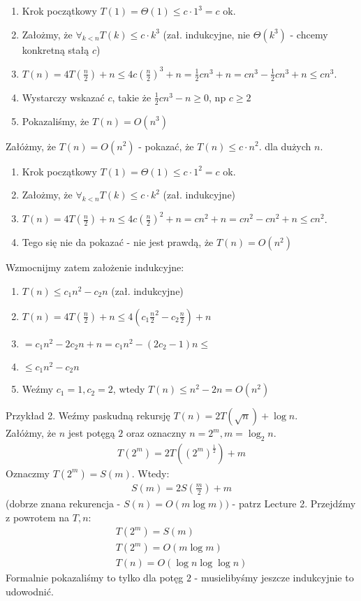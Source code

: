 \documentclass{article}
\numberwithin{equation}{subsection}
\begin{document}
\begin{enumerate}
    \item Krok początkowy $T(1) = \Theta(1) \leq c\cdot 1^3 = c$ ok.
    \item Założmy, że $\forall_{k<n}  T(k) \leq c\cdot k^3$ (zał. indukcyjne, nie $\Theta(k^3)$ - chcemy konkretną stałą $c$)
    \item $T(n) = 4T\left(\frac{n}{2}\right) + n \leq 4c\left(\frac{n}{2}\right)^3 + n = \frac{1}{2}cn^3 + n = cn^3 - \frac{1}{2}cn^3 + n \leq cn^3$.
    \item Wystarczy wskazać $c$, takie że $\frac{1}{2}cn^3 - n \geq 0$, np $c\geq 2$
    \item Pokazaliśmy, że $T(n) = O(n^3)$
\end{enumerate}
Załóżmy, że $T(n)=O(n^2)$ - pokazać, że $T(n)\leq c\cdot n^2$. dla dużych $n$.
\begin{enumerate}
    \item Krok początkowy $T(1) = \Theta(1) \leq c\cdot 1^2 = c$ ok.
    \item Założmy, że $\forall_{k<n}  T(k) \leq c\cdot k^2$ (zał. indukcyjne)
    \item $T(n) = 4T\left(\frac{n}{2}\right) + n \leq 4c\left(\frac{n}{2}\right)^2 + n = cn^2 + n = cn^2 - cn^2 + n \leq cn^2$.
    \item Tego się nie da pokazać - nie jest prawdą, że $T(n) = O(n^2)$
\end{enumerate}
Wzmocnijmy zatem założenie indukcyjne:
\begin{enumerate}
    \item $T(n) \leq c_1 n^2 - c_2 n$ (zał. indukcyjne)
    \item $T(n) = 4T\left(\frac{n}{2}\right) + n \leq 4(c_1 \frac{n}{2}^2 - c_2 \frac{n}{2}) + n$
    \item $= c_1 n^2 - 2c_2 n + n = c_1n^2 - (2c_2 -1)n \leq$
    \item $\leq c_1n^2 - c_2n$
    \item Weźmy $c_1=1, c_2=2$, wtedy $T(n) \leq n^2 - 2n = O(n^2)$
\end{enumerate}

\noindent
Przykład 2. Weźmy paskudną rekursję $T(n) = 2T(\sqrt{n}) + \log n$.\\
Załóżmy, że $n$ jest potęgą $2$ oraz oznaczny $n=2^m, m=\log_2 n$.
\begin{align}
    T(2^m) = 2T((2^m)^\frac{1}{2}) + m
\end{align}
Oznaczmy $T(2^m) = S(m)$. Wtedy:
\begin{align}
    S(m) = 2S\left(\frac{m}{2}\right) + m
\end{align}
(dobrze znana rekurencja - $S(n) = O(m\log m))$ - patrz Lecture 2.
Przejdźmy z powrotem na $T,n$:
\begin{align}
    T(2^m) = S(m)\\
    T(2^m) = O(m \log m)\\
    T(n) = O(\log n \log \log n)
\end{align}
Formalnie pokazaliśmy to tylko dla potęg $2$ - musielibyśmy jeszcze indukcyjnie to udowodnić.\\
\end{document}
